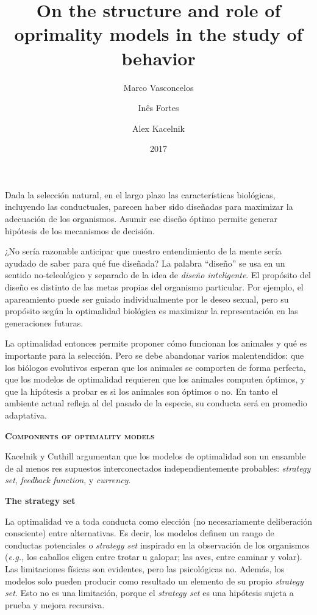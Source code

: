 \documentclass[a4paper,12pt]{article}
\title{On the structure and role of oprimality models in the study of behavior}
\author{Marco Vasconcelos \and Inês Fortes \and Alex Kacelnik}
\date{2017}
\begin{document}
{\scshape\bfseries \maketitle}

Dada la selección natural, en el largo plazo las características biológicas, incluyendo las conductuales, parecen haber sido diseñadas para maximizar la adecuación de los organismos. Asumir ese diseño óptimo permite generar hipótesis de los mecanismos de decisión.

¿No sería razonable anticipar que nuestro entendimiento de la mente sería ayudado de saber para qué fue diseñada? La palabra ``diseño'' se usa en un sentido no-teleológico y separado de la idea de {\itshape diseño inteligente}. El propósito del diseño es distinto de las metas propias del organismo particular. Por ejemplo, el apareamiento puede ser guiado individualmente por le deseo sexual, pero su propósito según la optimalidad biológica es maximizar la representación en las generaciones futuras.

La optimalidad entonces permite proponer cómo funcionan los animales y qué es importante para la selección. Pero se debe abandonar varios malentendidos: que los biólogos evolutivos esperan que los animales se comporten de forma perfecta, que los modelos de optimalidad requieren que los animales computen óptimos, y que la hipótesis a probar es si los animales son óptimos o no. En tanto el ambiente actual refleja al del pasado de la especie, su conducta será en promedio adaptativa.

{\scshape\bfseries Components of optimality models}

Kacelnik y Cuthill argumentan que los modelos de optimalidad son un ensamble de al menos res supuestos interconectados independientemente probables: {\itshape strategy set}, {\itshape feedback function}, y {\itshape currency}.

{\bfseries The strategy set}

La optimalidad ve a toda conducta como elección (no necesariamente deliberación consciente) entre alternativas. Es decir, los modelos definen un rango de conductas potenciales o {\itshape strategy set} inspirado en la observación de los organismos ({\itshape e.g.,} los caballos eligen entre trotar u galopar; las aves, entre caminar y volar). Las limitaciones físicas son evidentes, pero las psicológicas no. Además, los modelos solo pueden producir como resultado un elemento de su propio {\itshape strategy set}. Esto no es una limitación, porque el {\itshape strategy set} es una hipótesis sujeta a prueba y mejora recursiva.
\end{document}
